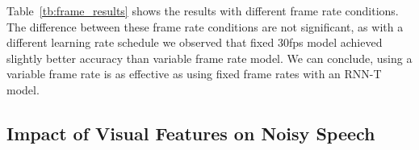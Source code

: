 \documentclass{article}
\newcommand{\negsectionspace}{\vspace{-4pt}}
\begin{document}
Table~\ref{tb:frame_results} shows the results with different frame
rate conditions.  The difference between these frame rate conditions
are not significant, as with a different learning rate schedule we
observed that fixed 30fps model achieved slightly better accuracy than
variable frame rate model.  We can conclude, using a variable frame
rate is as effective as using fixed frame rates with an RNN-T model\@.


\negsectionspace
\subsection{Impact of Visual Features on Noisy Speech}
\label{sec:noisy_results}
\negsectionspace

\begin{table}[!b]







\end{table}
\end{document}
